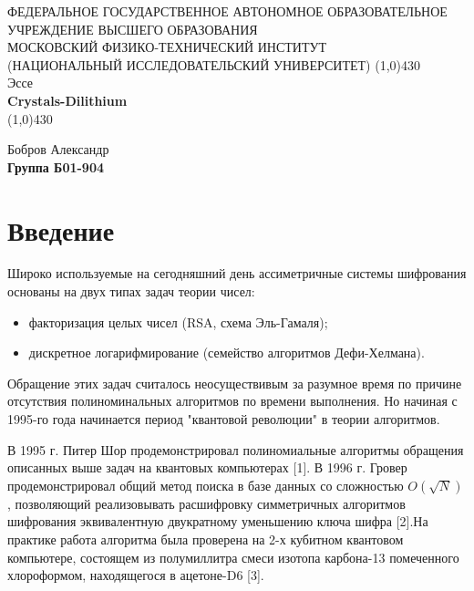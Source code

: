 \documentclass{article}
\begin{document}
	\begin{titlepage}
		\begin{center}
			\large{\small ФЕДЕРАЛЬНОЕ ГОСУДАРСТВЕННОЕ АВТОНОМНОЕ ОБРАЗОВАТЕЛЬНОЕ\\ УЧРЕЖДЕНИЕ ВЫСШЕГО ОБРАЗОВАНИЯ\\ МОСКОВСКИЙ ФИЗИКО-ТЕХНИЧЕСКИЙ ИНСТИТУТ\\ (НАЦИОНАЛЬНЫЙ ИССЛЕДОВАТЕЛЬСКИЙ УНИВЕРСИТЕТ)}
			\vfill
			\line(1,0){430}\\[1mm]
			\huge{Эссе}\\
			\huge\textbf{Crystals-Dilithium}\\
			\line(1,0){430}\\[1mm]
			\vfill
			\begin{flushright}
				\normalsize{Бобров Александр}\\
				\normalsize{\textbf{Группа Б01-904}}\\
			\end{flushright}
		\end{center}
	\end{titlepage}
	\section{
			Введение
	}

	Широко используемые на сегодняшний день ассиметричные системы шифрования основаны на двух типах задач теории чисел:
	\begin{itemize}
		\item факторизация целых чисел (RSA, схема Эль-Гамаля);
		\item дискретное логарифмирование (семейство алгоритмов Дефи-Хелмана).
	\end{itemize}

	Обращение этих задач считалось неосуществивым за разумное время по причине отсутствия полиноминальных алгоритмов по времени выполнения. Но начиная с 1995-го года начинается период "квантовой революции" в теории алгоритмов.
	
	В 1995 г. Питер Шор продемонстрировал полиномиальные алгоритмы
	обращения описанных выше задач на квантовых компьютерах [1]. В 1996 г. Гровер продемонстрировал общий метод поиска в базе данных со сложностью $O(\sqrt{N})$, позволяющий реализовывать расшифровку
	симметричных алгоритмов шифрования эквивалентную двукратному уменьшению ключа шифра [2].На практике работа алгоритма была проверена на 2-х кубитном квантовом компьютере, состоящем из полумиллитра
	смеси изотопа карбона-13 помеченного хлороформом, находящегося в ацетоне-D6 [3].
	
\end{document}
